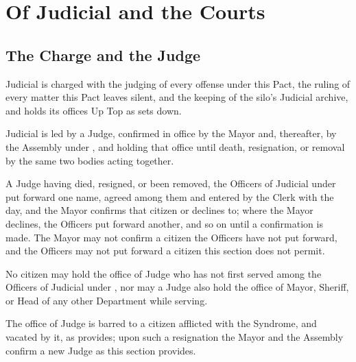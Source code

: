 \chapter{Of Judicial and the Courts}
\label{art:judicial}


\section{The Charge and the Judge}
\label{sec:judicial:charge-and-the-judge}

Judicial is charged with the judging of every offense under this Pact, the ruling of every matter this Pact leaves silent, and the keeping of the silo's Judicial archive, and holds its offices Up Top as  sets down.

\begin{clauses}
\item Judicial is led by a Judge, confirmed in office by the Mayor and, thereafter, by the Assembly under , and holding that office until death, resignation, or removal by the same two bodies acting together.
\item A Judge having died, resigned, or been removed, the Officers of Judicial under  put forward one name, agreed among them and entered by the Clerk with the day, and the Mayor confirms that citizen or declines to; where the Mayor declines, the Officers put forward another, and so on until a confirmation is made. The Mayor may not confirm a citizen the Officers have not put forward, and the Officers may not put forward a citizen this section does not permit.
\item No citizen may hold the office of Judge who has not first served among the Officers of Judicial under , nor may a Judge also hold the office of Mayor, Sheriff, or Head of any other Department while serving.
\item The office of Judge is barred to a citizen afflicted with the Syndrome, and vacated by it, as  provides; upon such a resignation the Mayor and the Assembly confirm a new Judge as this section provides.
\end{clauses}

